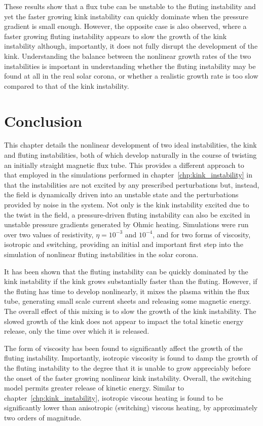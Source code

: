 These results show that a flux tube can be unstable to the fluting instability and yet the faster growing kink instability can quickly dominate when the pressure gradient is small enough. However, the opposite case is also observed, where a faster growing fluting instability appears to slow the growth of the kink instability although, importantly, it does not fully disrupt the development of the kink. Understanding the balance between the nonlinear growth rates of the two instabilities is important in understanding whether the fluting instability may be found at all in the real solar corona, or whether a realistic growth rate is too slow compared to that of the kink instability.

\section{Conclusion}

This chapter details the nonlinear development of two ideal instabilities, the kink and fluting instabilities, both of which develop naturally in the course of twisting an initially straight magnetic flux tube. This provides a different approach to that employed in the simulations performed in chapter~\ref{chp:kink_instability} in that the instabilities are not excited by any prescribed perturbations but, instead, the field is dynamically driven into an unstable state and the perturbations provided by noise in the system. Not only is the kink instability excited due to the twist in the field, a pressure-driven fluting instability can also be excited in unstable pressure gradients generated by Ohmic heating. Simulations were run over two values of resistivity, $\eta=10^{-3}$ and $10^{-4}$, and for two forms of viscosity, isotropic and switching, providing an initial and important first step into the simulation of nonlinear fluting instabilities in the solar corona.

It has been shown that the fluting instability can be quickly dominated by the kink instability if the kink grows substantially faster than the fluting. However, if the fluting has time to develop nonlinearly, it mixes the plasma within the flux tube, generating small scale current sheets and releasing some magnetic energy. The overall effect of this mixing is to slow the growth of the kink instability. The slowed growth of the kink does not appear to impact the total kinetic energy release, only the time over which it is released. 

The form of viscosity has been found to significantly affect the growth of the fluting instability. Importantly, isotropic viscosity is found to damp the growth of the fluting instability to the degree that it is unable to grow appreciably before the onset of the faster growing nonlinear kink instability. Overall, the switching model permits greater release of kinetic energy. Similar to chapter~\ref{chp:kink_instability}, isotropic viscous heating is found to be significantly lower than anisotropic (switching) viscous heating, by approximately two orders of magnitude.

